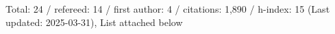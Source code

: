 Total: 24 / refereed: 14 / first author: 4 / citations: 1,890 / h-index: 15 (Last updated: 2025-03-31), List attached below